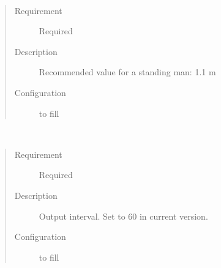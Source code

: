 \documentclass[letterpaper,10pt,english]{sphinxmanual}
\begin{document}

\begin{fulllineitems}
\label{\detokenize{input_files/SOLWEIG_input/SOLWEIGinput:cmdoption-arg-heightgravity}}~\begin{quote}\begin{description}
\item[{Requirement}] \leavevmode
Required

\item[{Description}] \leavevmode
Recommended value for a standing man: 1.1 m

\item[{Configuration}] \leavevmode
to fill

\end{description}\end{quote}

\end{fulllineitems}


\begin{fulllineitems}
\label{\detokenize{input_files/SOLWEIG_input/SOLWEIGinput:cmdoption-arg-outinterval}}~\begin{quote}\begin{description}
\item[{Requirement}] \leavevmode
Required

\item[{Description}] \leavevmode
Output interval. Set to 60 in current version.

\item[{Configuration}] \leavevmode
to fill

\end{description}\end{quote}

\end{fulllineitems}

\end{document}
